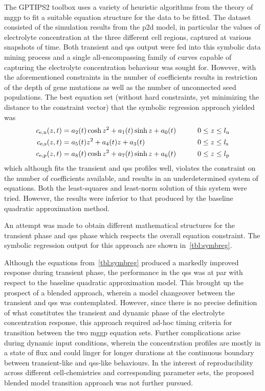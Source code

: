 The GPTIPS2  toolbox uses a variety  of heuristic algorithms from  the theory of
\gls{mggp} to fit a  suitable equation structure for the data  to be fitted. The
dataset  consisted  of the  simulation  results  from  the \gls{p2d}  model,  in
particular  the  values of  electrolyte  concentration  at the  three  different
cell  regions,  captured  at  various  snapshots of  time.  Both  transient  and
\gls{qss}  output  were  fed  into  this symbolic  data  mining  process  and  a
single all-encompassing  family of curves  capable of capturing  the electrolyte
concentration  behaviour  was  sought  for.  However,  with  the  aforementioned
constraints in the number of coefficients results in restriction of the depth of
gene mutations as  well as the number of unconnected  seed populations. The best
equation  set (without  hard constraints,  yet  minimizing the  distance to  the
constraint vector) that the symbolic regression approach yielded was
\begin{alignat}{2}
    c_{\text{e,n}}(z,t) & = a_2(t) \cosh z^2 + a_1(t) \sinh z + a_0(t) \qquad &  & 0 \le z \le l_\text{n}   \\
    c_{\text{e,s}}(z,t) & = a_5(t) z^2 + a_4(t) z + a_3(t) \qquad &  & 0 \le z \le l_\text{s}   \\
    c_{\text{e,p}}(z,t) & = a_8(t) \cosh z^2 + a_7(t) \sinh z + a_6(t) \qquad &  & 0 \le z \le l_\text{p}
\end{alignat}
which  although  fits  the  transient  and  \gls{qss}  profiles  well,  violates
the  constraint on  the  number of  coefficients available,  and  results in  an
underdetermined  system  of equations.  Both  the  least-squares and  least-norm
solution of this  system were tried. However, the results  were inferior to that
produced by the baseline quadratic approximation method.

An  attempt  was  made  to  obtain different  mathematical  structures  for  the
transient  phase  and  \gls{qss}  phase  which  respects  the  overall  equation
constraint.  The  symbolic  regression  output   for  this  approach  are  shown
in~\cref{tbl:symbreg}.


Although  the equations  from~\cref{tbl:symbreg}  produced  a markedly  improved
response during  transient phase, the  performance in  the \gls{qss} was  at par
with respect to the baseline quadratic  approximation model. This brought up the
prospect of a blended approach, wherein a model changeover between the transient
and \gls{qss}  was contemplated. However,  since there is no  precise definition
of  what  constitutes  the  transient  and  dynamic  phase  of  the  electrolyte
concentration  response,  this  approach  required ad-hoc  timing  criteria  for
transition between the two \gls{mggp} equation sets. Further complications arise
during dynamic input  conditions, wherein the concentration  profiles are mostly
in a  state of  flux and  could linger  for longer  durations at  the continuous
boundary between  transient-like and \gls{qss}-like behaviours.  In the interest
of reproducibility across different cell-chemistries and corresponding parameter
sets, the proposed blended model transition approach was not further pursued.

